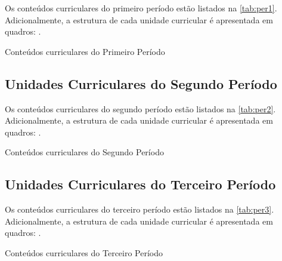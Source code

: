 Os conteúdos curriculares do primeiro período estão listados na \autoref{tab:per1}. Adicionalmente, a estrutura de cada unidade curricular é apresentada em quadros: .

\begin{table}[!htb]
	\centering\footnotesize
	\caption{Conteúdos curriculares do Primeiro Período}
	\label{tab:per1}
\end{table}

\clearpage



\subsection{Unidades Curriculares do Segundo Período}

Os conteúdos curriculares do segundo período estão listados na \autoref{tab:per2}. Adicionalmente, a estrutura de cada unidade curricular é apresentada em quadros: .

\begin{table}[!htb]
	\centering\footnotesize
	\caption{Conteúdos curriculares do Segundo Período}
	\label{tab:per2}
\end{table}

\clearpage

\subsection{Unidades Curriculares do Terceiro Período}

Os conteúdos curriculares do terceiro período estão listados na \autoref{tab:per3}. Adicionalmente, a estrutura de cada unidade curricular é apresentada em quadros: .

\begin{table}[!htb]
	\centering\footnotesize
	\caption{Conteúdos curriculares do Terceiro Período}
	\label{tab:per3}
\end{table}

